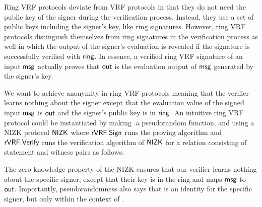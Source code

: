 Ring VRF protocols deviate from VRF protocols in that they do not need the public key of the signer during the verification process. Instead, they use a set of public keys including the signer's key, like ring signatures. However, ring VRF protocols distinguish themselves from ring signatures   in the verification process as well  in which the output of the signer's evaluation is revealed if the signature is successfully verified with $\mathsf{ring}$.
In essence, a verified ring VRF signature of an input  $ \mathsf{msg} $ actually proves that $ {\mathsf{out}} $ is the evaluation output of $ \mathsf{msg} $ generated by the signer's key. 

We want to achieve anonymity in ring VRF protocols meaning that the verifier learns nothing about the signer except that the  evaluation value of the signed input $ \mathsf{msg} $ is $ {\mathsf{out}} $ and the signer's public key is in $ \mathsf{ring} $.
An intuitive ring VRF protocol could be instantiated by making
\rVRF.\Eval a pseudorandom function, and using a NIZK protocol $ {\mathsf{NIZK}} $ where $ {\mathsf{rVRF}}.{\mathsf{Sign}} $ runs the proving algorithm and $ {\mathsf{rVRF}}.{\mathsf{Verify}} $ runs the verification algorithm of $ {\mathsf{NIZK}} $ for a relation consisting of statement and witness pairs as follows:




The zero-knowledge property of the NIZK ensures that our verifier learns nothing about the specific
signer, except that their key is in the ring and maps $\mathsf{msg}$ to ${\mathsf{out}}$.
Importantly, pseudorandomness also says that \Out is an identity
for the specific signer, but only within the context of \msg.

